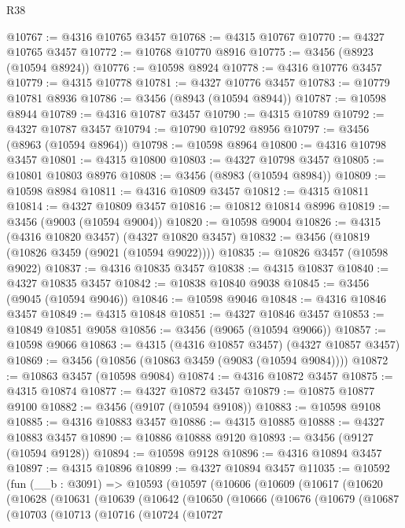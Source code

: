 \begin{lexlean}{R38}
\begin{coremodule}
@10767 := @4316 @10765 @3457
@10768 := @4315 @10767
@10770 := @4327 @10765 @3457
@10772 := @10768 @10770 @8916
@10775 := @3456 (@8923 (@10594 @8924))
@10776 := @10598 @8924
@10778 := @4316 @10776 @3457
@10779 := @4315 @10778
@10781 := @4327 @10776 @3457
@10783 := @10779 @10781 @8936
@10786 := @3456 (@8943 (@10594 @8944))
@10787 := @10598 @8944
@10789 := @4316 @10787 @3457
@10790 := @4315 @10789
@10792 := @4327 @10787 @3457
@10794 := @10790 @10792 @8956
@10797 := @3456 (@8963 (@10594 @8964))
@10798 := @10598 @8964
@10800 := @4316 @10798 @3457
@10801 := @4315 @10800
@10803 := @4327 @10798 @3457
@10805 := @10801 @10803 @8976
@10808 := @3456 (@8983 (@10594 @8984))
@10809 := @10598 @8984
@10811 := @4316 @10809 @3457
@10812 := @4315 @10811
@10814 := @4327 @10809 @3457
@10816 := @10812 @10814 @8996
@10819 := @3456 (@9003 (@10594 @9004))
@10820 := @10598 @9004
@10826 := @4315 (@4316 @10820 @3457) (@4327 @10820 @3457)
@10832 := @3456 (@10819 (@10826 @3459 (@9021 (@10594 @9022))))
@10835 := @10826 @3457 (@10598 @9022)
@10837 := @4316 @10835 @3457
@10838 := @4315 @10837
@10840 := @4327 @10835 @3457
@10842 := @10838 @10840 @9038
@10845 := @3456 (@9045 (@10594 @9046))
@10846 := @10598 @9046
@10848 := @4316 @10846 @3457
@10849 := @4315 @10848
@10851 := @4327 @10846 @3457
@10853 := @10849 @10851 @9058
@10856 := @3456 (@9065 (@10594 @9066))
@10857 := @10598 @9066
@10863 := @4315 (@4316 @10857 @3457) (@4327 @10857 @3457)
@10869 := @3456 (@10856 (@10863 @3459 (@9083 (@10594 @9084))))
@10872 := @10863 @3457 (@10598 @9084)
@10874 := @4316 @10872 @3457
@10875 := @4315 @10874
@10877 := @4327 @10872 @3457
@10879 := @10875 @10877 @9100
@10882 := @3456 (@9107 (@10594 @9108))
@10883 := @10598 @9108
@10885 := @4316 @10883 @3457
@10886 := @4315 @10885
@10888 := @4327 @10883 @3457
@10890 := @10886 @10888 @9120
@10893 := @3456 (@9127 (@10594 @9128))
@10894 := @10598 @9128
@10896 := @4316 @10894 @3457
@10897 := @4315 @10896
@10899 := @4327 @10894 @3457
@11035 := @10592
    (fun (__b : @3091) =>
    @10593
      (@10597
        (@10606
          (@10609
            (@10617
              (@10620
                (@10628
                  (@10631
                    (@10639
                      (@10642
                        (@10650
                          (@10666
                            (@10676
                              (@10679
                                (@10687
                                  (@10703
                                    (@10713
                                      (@10716
                                        (@10724
                                          (@10727

\end{coremodule}
\end{lexlean}
